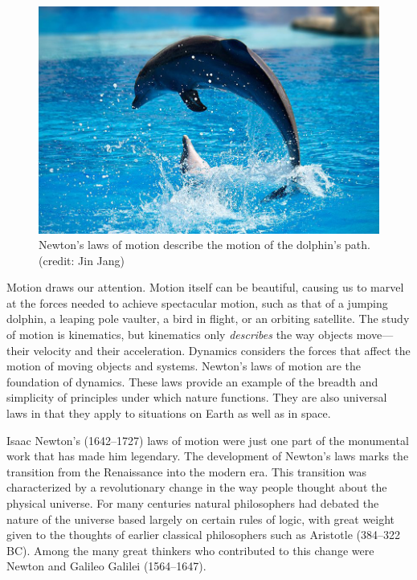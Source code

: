 \documentclass[
]{book}
\begin{document}
\begin{figure}
\hypertarget{import-auto-id2351295}{%
\centering
\includegraphics{images/Figure_04_00_01.jpg}
\caption{Newton's laws of motion describe the motion of the dolphin's path.
(credit: Jin Jang)}\label{import-auto-id2351295}
}
\end{figure}

Motion draws our attention. Motion itself can be beautiful, causing us
to marvel at the forces needed to achieve spectacular motion, such as
that of a jumping dolphin, a leaping pole vaulter, a bird in flight, or
an orbiting satellite. The study of motion is kinematics, but kinematics
only \emph{describes} the way objects move---their velocity and their
acceleration. \protect\hypertarget{import-auto-id2665402}{}{Dynamics}\textbf{} considers the forces
that affect the motion of moving objects and systems. Newton's laws of
motion are the foundation of dynamics. These laws provide an example of
the breadth and simplicity of principles under which nature functions.
They are also universal laws in that they apply to situations on Earth
as well as in space.

Isaac Newton's (1642--1727) laws of motion were just one part of the
monumental work that has made him legendary. The development of Newton's
laws marks the transition from the Renaissance into the modern era. This
transition was characterized by a revolutionary change in the way people
thought about the physical universe. For many centuries natural
philosophers had debated the nature of the universe based largely on
certain rules of logic, with great weight given to the thoughts of
earlier classical philosophers such as Aristotle (384--322 BC). Among
the many great thinkers who contributed to this change were Newton and
Galileo Galilei (1564--1647).
\end{document}
